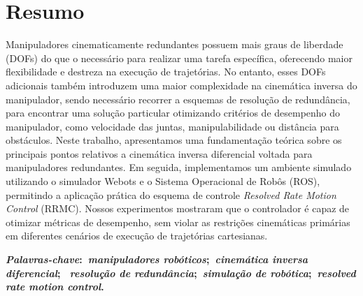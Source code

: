 \chapter*{Resumo}
\noindent Manipuladores cinematicamente redundantes possuem mais graus de liberdade (DOFs) do 
que o necessário para realizar uma tarefa específica, oferecendo maior flexibilidade e destreza na execução de trajetórias. 
No entanto, esses DOFs adicionais também introduzem uma maior complexidade na cinemática inversa do manipulador, sendo necessário 
recorrer a esquemas de resolução de redundância, para encontrar uma solução particular otimizando critérios de desempenho do manipulador,
como velocidade das juntas, manipulabilidade ou distância para obstáculos. Neste trabalho, apresentamos uma fundamentação teórica sobre 
os principais pontos relativos a cinemática inversa diferencial voltada para manipuladores redundantes. Em seguida, implementamos
um ambiente simulado utilizando o simulador Webots e o Sistema Operacional de Robôs (ROS), permitindo a aplicação prática do 
esquema de controle \emph{Resolved Rate Motion Control} (RRMC). Nossos experimentos mostraram que o controlador é capaz de otimizar
métricas de desempenho, sem violar as restrições cinemáticas primárias em diferentes cenários de execução de trajetórias cartesianas.

\vspace{5mm}

\noindent\textbf{
    \textit{Palavras-chave}:~\textit{manipuladores robóticos};~\textit{cinemática inversa diferencial};
    ~\textit{resolução de redundância};~\textit{simulação de robótica};~\textit{resolved rate motion control}.
}
